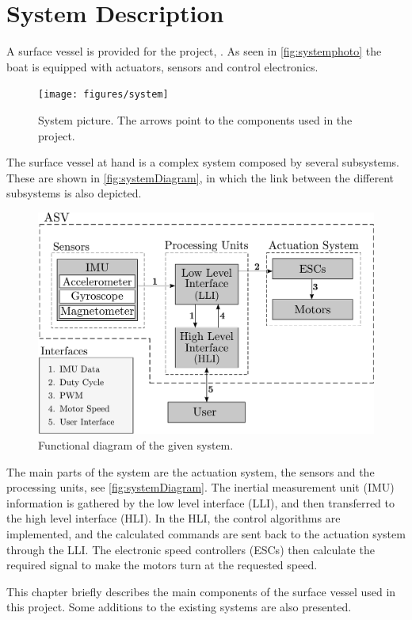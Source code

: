 \chapter{System Description}
A surface vessel is provided for the project, \cite{aauship}. As seen in \autoref{fig:systemphoto} the boat is equipped with actuators, sensors and control electronics.

\begin{figure}[H]
    \texttt{[image: figures/system]}
    \caption{System picture. The arrows point to the components used in the project.}
    \label{fig:systemphoto}
\end{figure}

The surface vessel at hand is a complex system composed by several subsystems. These are shown in \autoref{fig:systemDiagram}, in which the link between the different subsystems is also depicted.
%
\begin{figure}[H]
    \includegraphics[width=.65\textwidth]{figures/systemDiagram4}
    \caption{Functional diagram of the given system.}
    \label{fig:systemDiagram}
\end{figure}
%

The main parts of the system are the actuation system, the sensors and the processing units, see \autoref{fig:systemDiagram}. The inertial measurement unit (IMU) information is gathered by the low level interface (LLI), and then transferred to the high level interface (HLI). In the HLI, the control algorithms are implemented, and the calculated commands are sent back to the actuation system through the LLI. The electronic speed controllers (ESCs) then calculate the required signal to make the motors turn at the requested speed.

This chapter briefly describes the main components of the surface vessel used in this project. Some additions to the existing systems are also presented.

